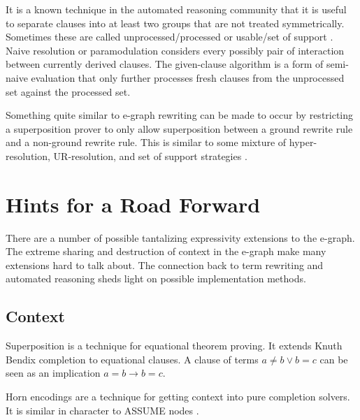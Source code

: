 \documentclass[sigplan,10pt,review,anonymous]{acmart}
\begin{document}
It is a known technique in the automated reasoning community that it is useful to separate clauses into at least two groups that are not treated symmetrically. Sometimes these are called unprocessed/processed or usable/set of support \cite{ottermanual}. Naive resolution or paramodulation considers every possibly pair of interaction between currently derived clauses. The given-clause algorithm is a form of semi-naive evaluation that only further processes fresh clauses from the unprocessed set against the processed set.

Something quite similar to e-graph rewriting can be made to occur by restricting a superposition prover to only allow superposition between a ground rewrite rule and a non-ground rewrite rule. This is similar to some mixture of hyper-resolution, UR-resolution, and set of support strategies \cite{wosautomated}.




\section{Hints for a Road Forward}
There are a number of possible tantalizing expressivity extensions to the e-graph. The extreme sharing and destruction of context in the e-graph make many extensions hard to talk about. The connection back to term rewriting and automated reasoning sheds light on possible implementation methods.


\subsection{Context}
Superposition is a technique for equational theorem proving. It extends Knuth Bendix completion to equational clauses. A clause of terms $a \neq b \vee b = c$ can be seen as an implication $a = b \rightarrow b = c$. 

Horn encodings \cite{hornformula} are a technique for getting context into pure completion solvers. It is similar in character to ASSUME nodes \cite{coward2023automating}.
\end{document}

